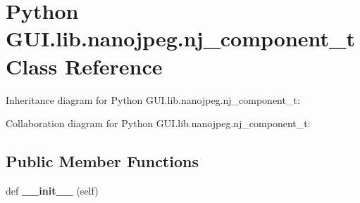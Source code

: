 \hypertarget{class_python_01_g_u_i_1_1lib_1_1nanojpeg_1_1nj__component__t}{}\section{Python G\+U\+I.\+lib.\+nanojpeg.\+nj\+\_\+component\+\_\+t Class Reference}
\label{class_python_01_g_u_i_1_1lib_1_1nanojpeg_1_1nj__component__t}


Inheritance diagram for Python G\+U\+I.\+lib.\+nanojpeg.\+nj\+\_\+component\+\_\+t\+:


Collaboration diagram for Python G\+U\+I.\+lib.\+nanojpeg.\+nj\+\_\+component\+\_\+t\+:
\subsection*{Public Member Functions}
\begin{DoxyCompactItemize}
\item 
\mbox{\label{class_python_01_g_u_i_1_1lib_1_1nanojpeg_1_1nj__component__t_a6354891931c8cb0b47f82346603c9824}} 
def {\bfseries \+\_\+\+\_\+init\+\_\+\+\_\+} (self)
\end{DoxyCompactItemize}
